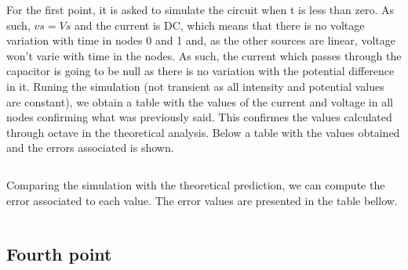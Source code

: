 \par For the first point, it is asked to simulate the circuit when t is less than zero. As such, $vs=Vs$ and the current is DC, which means that there is no voltage variation with time in nodes 0 and 1 and, as the other sources are linear, voltage won't varie with time in the nodes. As such, the current which passes through the capacitor is going to be null as there is no variation with the potential difference in it. Runing the simulation (not transient as all intensity and potential values are constant), we obtain a table with the values of the current and voltage in all nodes confirming what was previously said. This confirmes the values calculated through octave in the theoretical analysis. Below a table with the values obtained and the errors associated is shown.

\vspace{5mm}
\begin{table}[H]
\centering
\begin{tabularx}{0.6\textwidth} {
  | >{\raggedright\arraybackslash}X
  | >{\raggedleft\arraybackslash}X | }
 \hline

\end{tabularx}
\end{table}
\vspace{5mm}

\par Comparing the simulation with the theoretical prediction, we can compute the error associated to each value. The error values are presented in the table bellow.

\vspace{5mm}
\begin{table}[H]
\centering
\begin{tabularx}{0.6\textwidth} {
  | >{\raggedright\arraybackslash}X
  | >{\raggedleft\arraybackslash}X | }
 \hline

\end{tabularx}
\end{table}
\vspace{5mm}



\subsection{Fourth point}
\label{ssec:4S}

